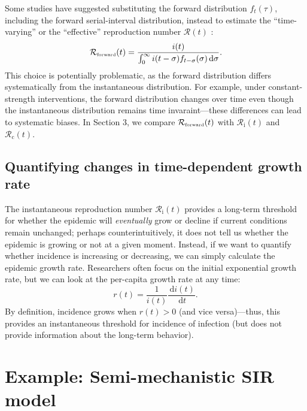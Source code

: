 \documentclass[12pt]{article}
\newcommand{\Rx}[1]{\ensuremath{{\mathcal R}_{#1}}\xspace}
\newcommand{\Rc}{\Rx{\mathrm{c}}}
\newcommand{\Ri}{\Rx{\mathrm{i}}}
\newcommand{\RR}{\ensuremath{{\mathcal R}}\xspace}
\newcommand{\tsub}[2]{#1_{{\textrm{\tiny #2}}}}
\newcommand{\dd}[1]{\ensuremath{\, \mathrm{d}#1}}
\newcommand{\dsigma}{\dd{\sigma}}
\begin{document}
Some studies have suggested substituting the forward distribution $f_t(\tau)$, including the forward serial-interval distribution, instead to estimate the ``time-varying'' or the ``effective'' reproduction number $\RR(t)$ \citep{liu2018measurability, ali2020serial}:
\begin{equation}
\tsub{\RR}{forward}(t) = \frac{i(t)}{\int_0^\infty i(t-\sigma) f_{t-\sigma}(\sigma) \dsigma}.
\end{equation}
This choice is potentially problematic, as the forward distribution differs systematically from the instantaneous distribution.
For example, under constant-strength interventions, the forward distribution changes over time even though the instantaneous distribution remains time invaraint---these differences can lead to systematic biases.
In Section 3, we compare $\tsub{\RR}{forward}(t)$ with $\Ri(t)$ and $\Rc(t)$.

\subsection{Quantifying changes in time-dependent growth rate}

The instantaneous reproduction number $\Ri(t)$ provides a long-term threshold for whether the epidemic will \emph{eventually} grow or decline if current conditions remain unchanged;
perhaps counterintuitively, it does not tell us whether the epidemic is growing or not at a given moment.
Instead, if we want to quantify whether incidence is increasing or decreasing, we can simply calculate the epidemic growth rate.
Researchers often focus on the initial exponential growth rate, but we can look at the per-capita growth rate at any time:
\begin{equation}
r(t) = \frac{1}{i(t)} \frac{\dd{i(t)}}{\dd{t}}.
\end{equation}
By definition, incidence grows when $r(t) > 0$ (and vice versa)---thus, this provides an instantaneous threshold for incidence of infection (but does not provide information about the long-term behavior).

\section{Example: Semi-mechanistic SIR model}
\end{document}
